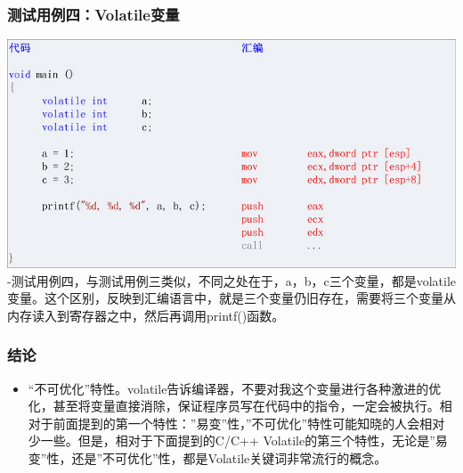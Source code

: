 \documentclass[9pt,b5paper]{article}
\begin{document}
\subsubsection{测试用例四：Volatile变量}
\label{sec-8-2-2}
\includegraphics[width=.9\linewidth]{../pic/v4.jpg}
  -测试用例四，与测试用例三类似，不同之处在于，a，b，c三个变量，都是volatile变量。这个区别，反映到汇编语言中，就是三个变量仍旧存在，需要将三个变量从内存读入到寄存器之中，然后再调用printf()函数。
\subsubsection{结论}
\label{sec-8-2-3}
\begin{itemize}
\item “不可优化”特性。volatile告诉编译器，不要对我这个变量进行各种激进的优化，甚至将变量直接消除，保证程序员写在代码中的指令，一定会被执行。相对于前面提到的第一个特性：”易变”性，”不可优化”特性可能知晓的人会相对少一些。但是，相对于下面提到的C/C++ Volatile的第三个特性，无论是”易变”性，还是”不可优化”性，都是Volatile关键词非常流行的概念。
\end{itemize}
\end{document}

